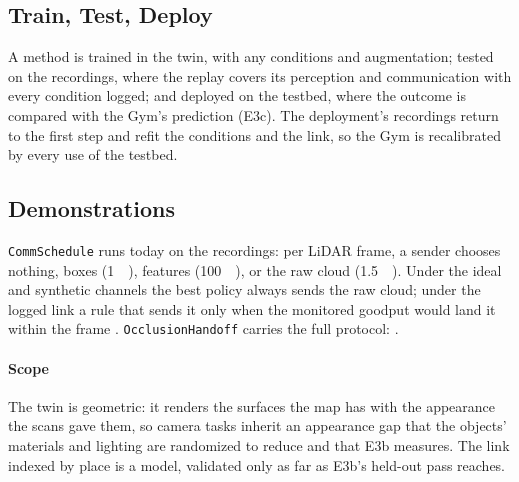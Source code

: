 \subsection{Train, Test, Deploy}
A method is trained in the twin, with any conditions and augmentation;
tested on the recordings, where the replay covers its perception and
communication with every condition logged; and deployed on the
testbed, where the outcome is compared with the Gym's prediction
(E3c). The deployment's recordings return to the first step and refit
the conditions and the link, so the Gym is recalibrated by every use of
the testbed.

\subsection{Demonstrations}
\texttt{CommSchedule} runs today on the recordings: per LiDAR frame, a
sender chooses nothing, boxes (\SI{1}{\kilo\byte}), features
(\SI{100}{\kilo\byte}), or the raw cloud (\SI{1.5}{\mega\byte}). Under
the ideal and synthetic channels the best policy always sends the raw
cloud; under the logged link a rule that sends it only when the
monitored goodput would land it within the frame .
\texttt{OcclusionHandoff} carries the full protocol: .

\paragraph{Scope} The twin is geometric: it renders the surfaces the
map has with the appearance the scans gave them, so camera tasks
inherit an appearance gap that the objects' materials and lighting are
randomized to reduce and that E3b measures. The link indexed by place
is a model, validated only as far as E3b's held-out pass reaches.
